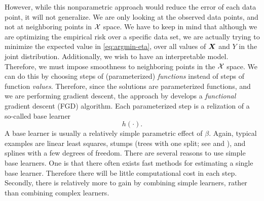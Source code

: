 However, while this nonparametric approach would reduce the error of each data point, it will not generalize.
We are only looking at the observed data points, and not at neighboring points in $\mathcal{X}$ space.
We have to keep in mind that although we are optimizing the empirical risk over a specific data set,
we are actually trying to minimize the expected value in \eqref{eq:argmin-eta}, over all values of $\bm{X}$ and $Y$ in the joint distribution.
Additionally, we wish to have an interpretable model.
Therefore, we must impose smoothness to neighboring points in the $\mathcal{X}$ space. We can do this by choosing steps of
(parameterized) \textit{functions} instead of steps of function \textit{values}.
Therefore, since the solutions are parameterized functions, and we are performing gradient descent,
the approach by \citet{friedman2001} develops a \textit{functional} gradient descent (FGD) algorithm.
Each parameterized step is a relization of a so-called base learner
\begin{equation}
    h(\cdot).
\end{equation}
A base learner is usually a relatively simple parametric effect of $\beta$. Again, typical examples are linear least squares, stumps (trees with one split; see \citet{buhlmann2007} and \citet{ESL}), and splines with a few degrees of freedom.
There are several reasons to use simple base learners. One is that there often exists fast methods for estimating a single base learner.
Therefore there will be little computational cost in each step. Secondly, there is relatively more to gain by combining simple learners,
rather than combining complex learners.

